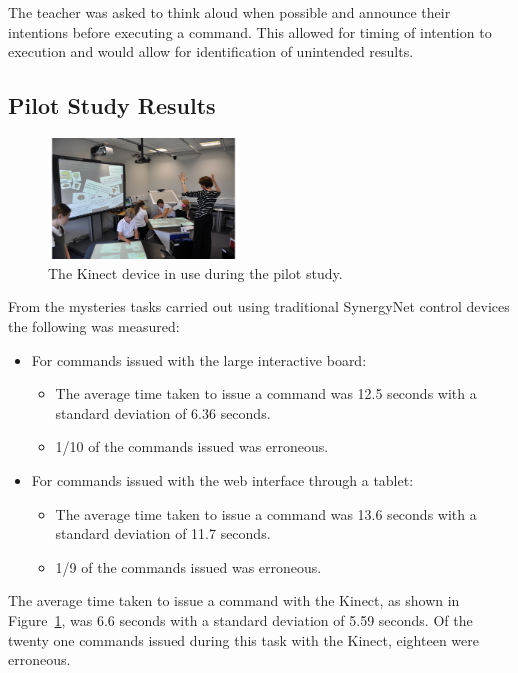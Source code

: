 \documentclass[link]{IWCOMP}
\begin{document}
The teacher was asked to think aloud when possible and announce their intentions before executing a command.  
This allowed for timing of intention to execution and would allow for identification of unintended results.

\subsection{Pilot Study Results}
\label{subsec:pilotStudyResults}

\begin{figure}[h]
	\centering
   \includegraphics[width=0.45\textwidth]{figures/pilot_study_kinect.png}
   \caption{The Kinect device in use during the pilot study.}
   \label{fig:pilotStudyKinect}
\end{figure} 

From the mysteries tasks carried out using traditional SynergyNet control devices the following was measured:
\begin{itemize}
   \item For commands issued with the large interactive board:
   \begin{itemize}
      \item The average time taken to issue a command was 12.5 seconds with a standard deviation of 6.36 seconds.
      \item 1/10 of the commands issued was erroneous.
   \end{itemize}
   \item For commands issued with the web interface through a tablet:
   \begin{itemize}
      \item The average time taken to issue a command was 13.6 seconds with a standard deviation of 11.7 seconds.
      \item 1/9 of the commands issued was erroneous.
   \end{itemize}
\end{itemize}

The average time taken to issue a command with the Kinect, as shown in Figure~\ref{fig:pilotStudyKinect}, was 6.6 seconds with a standard deviation of 5.59 seconds.
Of the twenty one commands issued during this task with the Kinect, eighteen were erroneous.
\end{document}
